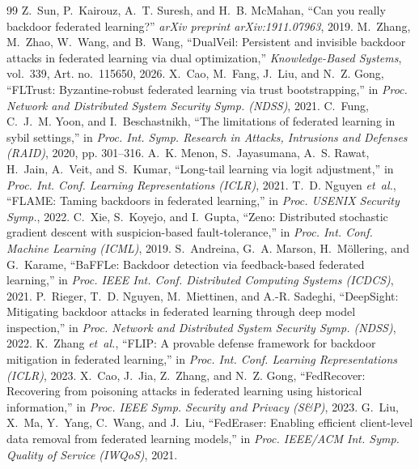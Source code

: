 \documentclass[conference]{IEEEtran}
\begin{document}
\begin{thebibliography}{99}
 Z.~Sun, P.~Kairouz, A.~T. Suresh, and H.~B. McMahan, ``Can you really backdoor federated learning?'' \emph{arXiv preprint arXiv:1911.07963}, 2019.
 M.~Zhang, M.~Zhao, W.~Wang, and B.~Wang, ``DualVeil: Persistent and invisible backdoor attacks in federated learning via dual optimization,'' \emph{Knowledge-Based Systems}, vol.~339, Art. no.~115650, 2026.
 X.~Cao, M.~Fang, J.~Liu, and N.~Z. Gong, ``FLTrust: Byzantine-robust federated learning via trust bootstrapping,'' in \emph{Proc. Network and Distributed System Security Symp. (NDSS)}, 2021.
 C.~Fung, C.~J.~M. Yoon, and I.~Beschastnikh, ``The limitations of federated learning in sybil settings,'' in \emph{Proc. Int. Symp. Research in Attacks, Intrusions and Defenses (RAID)}, 2020, pp. 301--316.
 A.~K. Menon, S.~Jayasumana, A.~S. Rawat, H.~Jain, A.~Veit, and S.~Kumar, ``Long-tail learning via logit adjustment,'' in \emph{Proc. Int. Conf. Learning Representations (ICLR)}, 2021.
 T.~D. Nguyen \emph{et~al.}, ``FLAME: Taming backdoors in federated learning,'' in \emph{Proc. USENIX Security Symp.}, 2022.
 C.~Xie, S.~Koyejo, and I.~Gupta, ``Zeno: Distributed stochastic gradient descent with suspicion-based fault-tolerance,'' in \emph{Proc. Int. Conf. Machine Learning (ICML)}, 2019.
 S.~Andreina, G.~A. Marson, H.~M{\"o}llering, and G.~Karame, ``BaFFLe: Backdoor detection via feedback-based federated learning,'' in \emph{Proc. IEEE Int. Conf. Distributed Computing Systems (ICDCS)}, 2021.
 P.~Rieger, T.~D. Nguyen, M.~Miettinen, and A.-R. Sadeghi, ``DeepSight: Mitigating backdoor attacks in federated learning through deep model inspection,'' in \emph{Proc. Network and Distributed System Security Symp. (NDSS)}, 2022.
 K.~Zhang \emph{et~al.}, ``FLIP: A provable defense framework for backdoor mitigation in federated learning,'' in \emph{Proc. Int. Conf. Learning Representations (ICLR)}, 2023.
 X.~Cao, J.~Jia, Z.~Zhang, and N.~Z. Gong, ``FedRecover: Recovering from poisoning attacks in federated learning using historical information,'' in \emph{Proc. IEEE Symp. Security and Privacy (S\&P)}, 2023.
 G.~Liu, X.~Ma, Y.~Yang, C.~Wang, and J.~Liu, ``FedEraser: Enabling efficient client-level data removal from federated learning models,'' in \emph{Proc. IEEE/ACM Int. Symp. Quality of Service (IWQoS)}, 2021.
\end{thebibliography}
\end{document}
